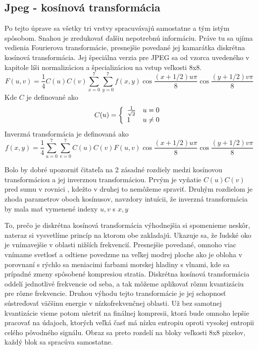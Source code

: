 \subsection{Jpeg - kosínová transformácia}

Po tejto úprave sa všetky tri vrstvy spracuvávajú samostatne a tým
istým spôsobom. Snahou je zredukovať ďalšiu nepotrebnú informáciu.
Práve tu sa ujíma vedienia Fourierova transformácie, presnejšie
povedané jej kamarátka diskrétna kosínová transformácia. Jej špeciálna
verzia pre JPEG sa od vzorca \todo{} uvedeného v kapitole \todo{}
líši normalizáciou a špecializáciou na vstup veľkosti 8x8.
\begin{equation}
   F(u,v) = \frac{1}{4} C(u) C(v) 
    \sum_{x=0}^7 \sum_{y=0}^7 f(x,y)
        \cos\frac{(x+1/2) u \pi}{8}
        \cos\frac{(y+1/2) v \pi}{8}
\end{equation}
Kde $C$ je definované ako
\begin{equation}
    C(u) = \left\{
        \begin{array}{l l}
            \frac{1}{\sqrt{2}} & u=0 \\
            1 & u\not=0
        \end{array}
        \right.
\end{equation}
Inverzná transformácia je definovaná ako
\begin{equation}
    f(x,y) = \frac{1}{4} 
        \sum_{u=0}^7 \sum_{v=0}^7 C(u) C(v) F(u,v)
        \cos\frac{(x+1/2) u \pi}{8}
        \cos\frac{(y+1/2) v \pi}{8}
\end{equation}
\begin{poznamka}
    Bolo by dobré upozorniť čitateľa na 2 zásadné rozdiely medzi
    kosínovou transformáciou a jej inverznou transformáciou. Prvým je
    vyňatie $C(u) C(v)$ pred sumu v rovnici , kdežto v
    druhej to nemôžeme spraviť. Druhým rozdielom je zhoda parametrov
    oboch kosínusov, navzdory intuícii, že inverzná transformácia by
    mala mať vymenené indexy $u,v$ s $x,y$
\end{poznamka}
To, prečo je
diskrétna kosínová transformácia výhodnejšia si spomenieme neskôr,
nateraz si vysvetlíme princíp na ktorom obe zakladajú. Ukazuje sa, že
ľudské oko je vnímavejšie v oblasti nižších frekvencií. Presnejšie
povedané, omnoho viac vnímame svetlosť a odtiene povedzme na veľkej
modrej ploche ako je obloha v porovnaní s rýchlo sa meniacimi farbami
morskej hladiny s vlnami, kde sa prípadné zmeny spôsobené kompresiou
stratia. Diskrétna kosínová transformácia oddelí
jednotlivé frekvencie od seba, a tak môžeme aplikovať rôznu
kvantizáciu pre rôzne frekvencie. Druhou výhodu tejto transformácie je
jej schopnosť sústreďovať väčšinu energie v nízkofrekvenčnej oblasti.
Už bez samotnej kvantizácie vieme potom ušetriť na finálnej kompresii,
ktorá bude omnoho lepšie pracovať na údajoch, ktorých veľká časť má
nízku entropiu oproti vysokej entropii celého pôvodného signálu.
Obraz sa preto rozdelí na bloky veľkosti 8x8 pixelov, každý blok sa
spracúva samostatne.

